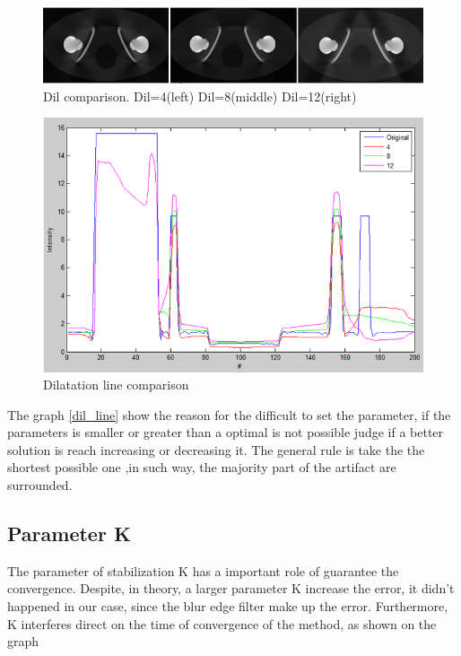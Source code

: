 \begin{figure}[H]
\centering
\includegraphics[scale=0.6]{img/dil_comp}
\caption{{Dil comparison. Dil=4(left) Dil=8(middle) Dil=12(right)}}\label{dil_comp}
\end{figure}

\begin{figure}[H]
\centering
\includegraphics[scale=0.7]{img/dil_line}
\caption{{Dilatation line comparison}}\label{dil_line}
\end{figure}

The graph \eqref{dil_line} show the reason for the difficult to set the parameter, if the parameters is smaller or greater than a optimal is not possible judge if a better solution is reach increasing or decreasing it. The general rule is take the the shortest possible one ,in such way, the majority part of the artifact are surrounded.

\subsection{Parameter K}
The parameter of stabilization K has a important role of guarantee the convergence. Despite, in theory, a larger parameter K increase the error, it didn't happened in our case, since the blur edge filter make up the error. Furthermore, K interferes direct on the time of convergence of the method, as shown on the graph 

